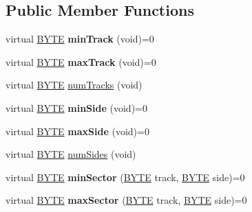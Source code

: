 \subsection*{Public Member Functions}
\begin{DoxyCompactItemize}
\item 
\hypertarget{classDisk_a84ae85ab4bd211cf23d8d383ad8f2dce}{}virtual \hyperlink{hi__types_8h_aae9749d96e15ccb4f482dd5f55d98f9b}{B\+Y\+T\+E} {\bfseries min\+Track} (void)=0\label{classDisk_a84ae85ab4bd211cf23d8d383ad8f2dce}

\item 
\hypertarget{classDisk_a6dabc40a2a204e7b8601c120da82a61e}{}virtual \hyperlink{hi__types_8h_aae9749d96e15ccb4f482dd5f55d98f9b}{B\+Y\+T\+E} {\bfseries max\+Track} (void)=0\label{classDisk_a6dabc40a2a204e7b8601c120da82a61e}

\item 
virtual \hyperlink{hi__types_8h_aae9749d96e15ccb4f482dd5f55d98f9b}{B\+Y\+T\+E} \hyperlink{classDisk_afeeca1516865154ea3fa3380a784e0c9}{num\+Tracks} (void)
\item 
\hypertarget{classDisk_ad92b9bba3c3e87e85d07cae62d7dfc4c}{}virtual \hyperlink{hi__types_8h_aae9749d96e15ccb4f482dd5f55d98f9b}{B\+Y\+T\+E} {\bfseries min\+Side} (void)=0\label{classDisk_ad92b9bba3c3e87e85d07cae62d7dfc4c}

\item 
\hypertarget{classDisk_af0afe14e286fcad6aed78431c389af88}{}virtual \hyperlink{hi__types_8h_aae9749d96e15ccb4f482dd5f55d98f9b}{B\+Y\+T\+E} {\bfseries max\+Side} (void)=0\label{classDisk_af0afe14e286fcad6aed78431c389af88}

\item 
virtual \hyperlink{hi__types_8h_aae9749d96e15ccb4f482dd5f55d98f9b}{B\+Y\+T\+E} \hyperlink{classDisk_aacfb8782312379d5d6bc65d3c852d864}{num\+Sides} (void)
\item 
\hypertarget{classDisk_a96696fe210037edf370d617a151bcf58}{}virtual \hyperlink{hi__types_8h_aae9749d96e15ccb4f482dd5f55d98f9b}{B\+Y\+T\+E} {\bfseries min\+Sector} (\hyperlink{hi__types_8h_aae9749d96e15ccb4f482dd5f55d98f9b}{B\+Y\+T\+E} track, \hyperlink{hi__types_8h_aae9749d96e15ccb4f482dd5f55d98f9b}{B\+Y\+T\+E} side)=0\label{classDisk_a96696fe210037edf370d617a151bcf58}

\item 
\hypertarget{classDisk_a95da6961a75776b25f48624dc50a0e98}{}virtual \hyperlink{hi__types_8h_aae9749d96e15ccb4f482dd5f55d98f9b}{B\+Y\+T\+E} {\bfseries max\+Sector} (\hyperlink{hi__types_8h_aae9749d96e15ccb4f482dd5f55d98f9b}{B\+Y\+T\+E} track, \hyperlink{hi__types_8h_aae9749d96e15ccb4f482dd5f55d98f9b}{B\+Y\+T\+E} side)=0\label{classDisk_a95da6961a75776b25f48624dc50a0e98}


\end{DoxyCompactItemize}
